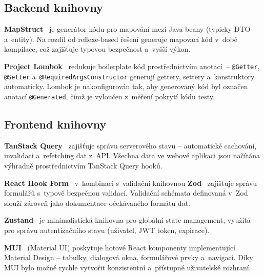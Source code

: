 \subsection{Backend knihovny}

\textbf{MapStruct}~\cite{mapstruct} je generátor kódu pro mapování mezi Java beany (typicky DTO a~entity). Na rozdíl od reflexe-based řešení generuje mapovací kód v~době kompilace, což zajišťuje typovou bezpečnost a~vyšší výkon.

\textbf{Project Lombok}~\cite{lombok} redukuje boilerplate kód prostřednictvím anotací~-- \texttt{@Getter}, \texttt{@Setter} a~\texttt{@RequiredArgsConstructor} generují gettery, settery a~konstruktory automaticky. Lombok je nakonfigurován tak, aby generovaný kód byl označen anotací \texttt{@Generated}, čímž je vyloučen z~měření pokrytí kódu testy.

\subsection{Frontend knihovny}

\textbf{TanStack Query}~\cite{tanstackquery} zajišťuje správu serverového stavu -- automatické cachování, invalidaci a~refetching dat z~API. Všechna data ve webové aplikaci jsou načítána výhradně prostřednictvím TanStack Query hooků.

\textbf{React Hook Form}~\cite{reacthookform} v~kombinaci s~validační knihovnou \textbf{Zod}~\cite{zod} zajišťuje správu formulářů s~typově bezpečnou validací. Validační schémata definovaná v~Zod slouží zároveň jako dokumentace očekávaného formátu dat.

\textbf{Zustand}~\cite{zustand} je minimalistická knihovna pro globální state management, využitá pro správu autentizačního stavu (uživatel, JWT token, expirace).

\textbf{MUI}~\cite{mui} (Material UI) poskytuje hotové React komponenty implementující Material Design -- tabulky, dialogová okna, formulářové prvky a~navigaci. Díky MUI bylo možné rychle vytvořit konzistentní a~přístupné uživatelské rozhraní.


